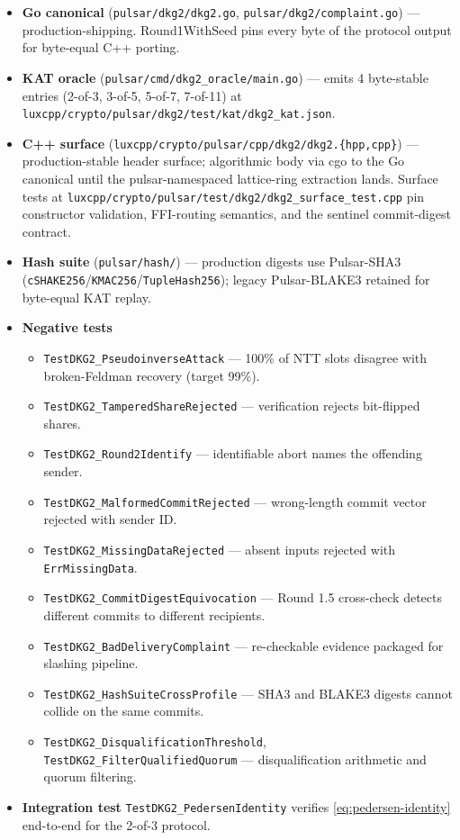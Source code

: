 \begin{itemize}[leftmargin=2em,nosep]
\item \textbf{Go canonical}
      (\texttt{pulsar/dkg2/dkg2.go}, \texttt{pulsar/dkg2/complaint.go})
      --- production-shipping. Round1WithSeed pins every byte of the
      protocol output for byte-equal C++ porting.
\item \textbf{KAT oracle}
      (\texttt{pulsar/cmd/dkg2\_oracle/main.go}) --- emits 4 byte-stable
      entries (2-of-3, 3-of-5, 5-of-7, 7-of-11) at
      \texttt{luxcpp/crypto/pulsar/dkg2/test/kat/dkg2\_kat.json}.
\item \textbf{C++ surface}
      (\texttt{luxcpp/crypto/pulsar/cpp/dkg2/dkg2.\{hpp,cpp\}}) ---
      production-stable header surface; algorithmic body via cgo to the
      Go canonical until the pulsar-namespaced lattice-ring extraction
      lands. Surface tests at
      \texttt{luxcpp/crypto/pulsar/test/dkg2/dkg2\_surface\_test.cpp}
      pin constructor validation, FFI-routing semantics, and the
      sentinel commit-digest contract.
\item \textbf{Hash suite}
      (\texttt{pulsar/hash/}) --- production digests use Pulsar-SHA3
      (\texttt{cSHAKE256}/\texttt{KMAC256}/\texttt{TupleHash256}); legacy
      Pulsar-BLAKE3 retained for byte-equal KAT replay.
\item \textbf{Negative tests}
      \begin{itemize}[nosep]
      \item \texttt{TestDKG2\_PseudoinverseAttack} --- 100\% of NTT slots
            disagree with broken-Feldman recovery (target 99\%).
      \item \texttt{TestDKG2\_TamperedShareRejected} --- verification
            rejects bit-flipped shares.
      \item \texttt{TestDKG2\_Round2Identify} --- identifiable abort
            names the offending sender.
      \item \texttt{TestDKG2\_MalformedCommitRejected} --- wrong-length
            commit vector rejected with sender ID.
      \item \texttt{TestDKG2\_MissingDataRejected} --- absent inputs
            rejected with \texttt{ErrMissingData}.
      \item \texttt{TestDKG2\_CommitDigestEquivocation} --- Round 1.5
            cross-check detects different commits to different
            recipients.
      \item \texttt{TestDKG2\_BadDeliveryComplaint} --- re-checkable
            evidence packaged for slashing pipeline.
      \item \texttt{TestDKG2\_HashSuiteCrossProfile} --- SHA3 and BLAKE3
            digests cannot collide on the same commits.
      \item \texttt{TestDKG2\_DisqualificationThreshold},
            \texttt{TestDKG2\_FilterQualifiedQuorum} --- disqualification
            arithmetic and quorum filtering.
      \end{itemize}
\item \textbf{Integration test}
      \texttt{TestDKG2\_PedersenIdentity} verifies
      \eqref{eq:pedersen-identity} end-to-end for the 2-of-3 protocol.
\end{itemize}

